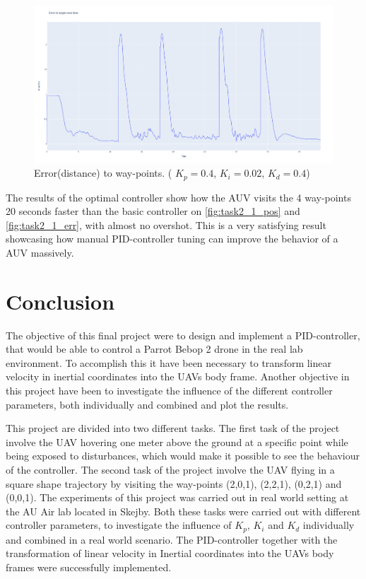 \documentclass[conference]{IEEEtran}
\begin{document}
\begin{figure}[hbtp]
	\centering
	\includegraphics[width=1.0\linewidth]{images/task2_6_err.png}
	\caption{Error(distance) to way-points. ( $K_p = 0.4$, $K_i = 0.02$, $K_d = 0.4$)}
	\label{fig:task2_6_err}
\end{figure}

The results of the optimal controller show how the AUV visits the 4 way-points 20 seconds faster than the basic controller on \cref{fig:task2_1_pos} and \cref{fig:task2_1_err}, with almost no overshot. This is a very satisfying result showcasing how manual PID-controller tuning can improve the behavior of a AUV massively.  

\section{Conclusion}
The objective of this final project were to design and implement a PID-controller, that would be able to control a Parrot Bebop 2 drone in the real lab environment. To accomplish this it have been necessary to transform linear velocity in inertial coordinates into the UAVs body frame. Another objective in this project have been to investigate the influence of the different controller parameters, both individually and combined and plot the results. 

This project are divided into two different tasks. The first task of the project involve the UAV hovering one meter above the ground at a specific point while being exposed to disturbances, which would make it possible to see the behaviour of the controller. The second task of the project involve the UAV flying in a square shape trajectory by visiting the way-points (2,0,1), (2,2,1), (0,2,1) and (0,0,1). The experiments of this project was carried out in real world setting at the AU Air lab located in Skejby. Both these tasks were carried out with different controller parameters, to investigate the influence of $K_p$, $K_i$ and $K_d$ individually and combined in a real world scenario. The PID-controller together with the transformation of linear velocity in Inertial coordinates into the UAVs body frames were successfully implemented.
\end{document}

